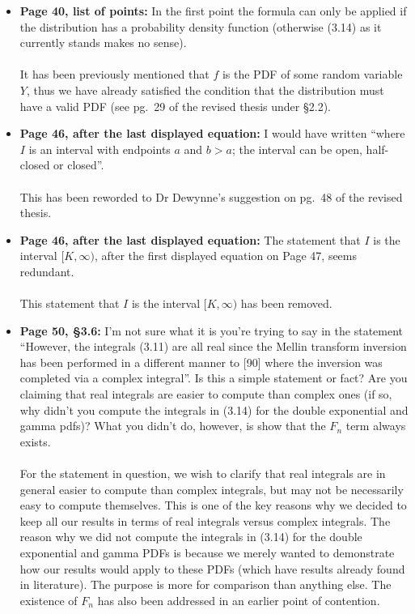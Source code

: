 \documentclass{article}
\begin{document}
\begin{enumerate}
\begin{itemize}
			\item{\textbf{Page 40, list of points: } In the first point the formula can only be applied if the distribution has a probability density function (otherwise (3.14) as it currently stands makes no sense).
			\\\\}
			It has been previously mentioned that $f$ is the PDF of some random variable $Y$, thus we have already satisfied the condition that the distribution must have a valid PDF (see pg.~29 of the revised thesis under \S2.2).
			
			\item{\textbf{Page 46, after the last displayed equation: } I would have written ``where $I$ is an interval with endpoints $a$ and $b > a$; the interval can be open, half-closed or closed''.
			\\\\}
			This has been reworded to Dr Dewynne's suggestion on pg.~48 of the revised thesis.
			
			\item{\textbf{Page 46, after the last displayed equation: } The statement that $I$ is the interval $[K,\infty)$, after the first displayed equation on Page 47, seems redundant.
			\\\\}
			This statement that $I$ is the interval $[K,\infty)$ has been removed.
			
			\item{\textbf{Page 50, \S3.6:} I'm not sure what it is you're trying to say in the statement ``However, the integrals (3.11) are all real since the Mellin transform inversion has been performed in a different manner to [90] where the inversion was completed via a complex integral''. Is this a simple statement or fact? Are you claiming that real integrals are easier to compute than complex ones (if so, why didn't you compute the integrals in (3.14) for the double exponential and gamma pdfs)? What you didn't do, however, is show that the $F_n$ term always exists.
			\\\\}
			For the statement in question, we wish to clarify that real integrals are in general easier to compute than complex integrals, but may not be necessarily easy to compute themselves. This is one of the key reasons why we decided to keep all our results in terms of real integrals versus complex integrals. The reason why we did not compute the integrals in (3.14) for the double exponential and gamma PDFs is because we merely wanted to demonstrate how our results would apply to these PDFs (which have results already found in literature). The purpose is more for comparison than anything else. The existence of $F_n$ has also been addressed in an earlier point of contention.
			

\end{itemize}
\end{enumerate}
\end{document}
